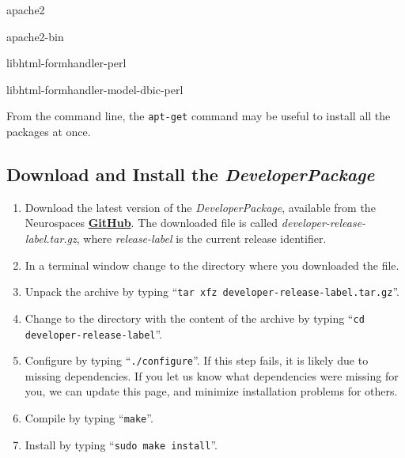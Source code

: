 \documentclass[12pt]{article}
\begin{document}
\begin{description}[noitemsep,nolistsep]

% 
% 
%
% 
% 

\item apache2
\item apache2-bin
\item libhtml-formhandler-perl
\item libhtml-formhandler-model-dbic-perl

\end{description}




From the command line, the {\tt apt-get} command may be useful to
install all the packages at once.


\subsection*{Download and Install the {\emph{DeveloperPackage}}}

\begin{enumerate}
   \item Download the latest version of the {\it DeveloperPackage}, available from the Neurospaces \href{https://github.com/HugoCornelis/developer/raw/master/developer-0.0.0-alpha.tar.gz}{\bf GitHub}.  The downloaded file is called {\it developer-release-label.tar.gz}, where {\it release-label} is the current release identifier.
   \item In a terminal window change to the directory where you downloaded the file.
   \item Unpack the archive by typing ``{\tt tar xfz developer-release-label.tar.gz}''.
   \item Change to the directory with the content of the archive by typing ``{\tt cd developer-release-label}''.
   \item Configure by typing ``{\tt ./configure}''.  If this step fails, it is likely due to missing dependencies.  If you let us know what dependencies were missing for you, we can update this page, and minimize installation problems for others.
   \item Compile by typing ``{\tt make}''.
   \item Install by typing ``{\tt sudo make install}''. 
\end{enumerate}
\end{document}
